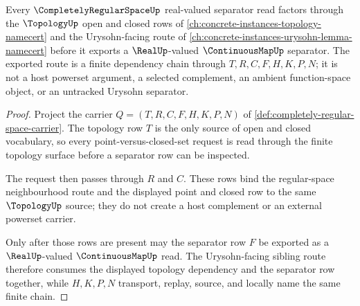 \begin{theorem}
\label{thm:completely-regular-space-topology-dependency-route}
Every $\CompletelyRegularSpaceUp$ real-valued separator read factors through the $\TopologyUp$ open and closed rows of \autoref{ch:concrete-instances-topology-namecert} and the Urysohn-facing route of \autoref{ch:concrete-instances-urysohn-lemma-namecert} before it exports a $\RealUp$-valued $\ContinuousMapUp$ separator. The exported route is a finite dependency chain through $T,R,C,F,H,K,P,N$; it is not a host powerset argument, a selected complement, an ambient function-space object, or an untracked Urysohn separator.
\end{theorem}
\begin{proof}
Project the carrier $Q=(T,R,C,F,H,K,P,N)$ of \autoref{def:completely-regular-space-carrier}. The topology row $T$ is the only source of open and closed vocabulary, so every point-versus-closed-set request is read through the finite topology surface before a separator row can be inspected.

The request then passes through $R$ and $C$. These rows bind the regular-space neighbourhood route and the displayed point and closed row to the same $\TopologyUp$ source; they do not create a host complement or an external powerset carrier.

Only after those rows are present may the separator row $F$ be exported as a $\RealUp$-valued $\ContinuousMapUp$ read. The Urysohn-facing sibling route therefore consumes the displayed topology dependency and the separator row together, while $H,K,P,N$ transport, replay, source, and locally name the same finite chain.
\end{proof}

